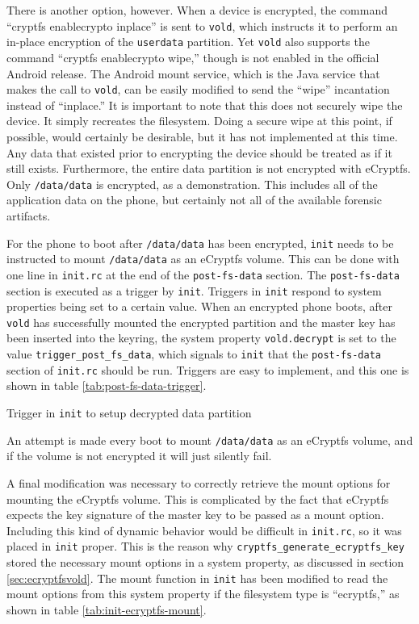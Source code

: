 There is another option, however. When a device is encrypted, the command ``cryptfs enablecrypto inplace'' is sent to \texttt{vold},
which instructs it to perform an in-place encryption of the \texttt{userdata} partition. Yet \texttt{vold} also supports the command
``cryptfs enablecrypto wipe,'' though is not enabled in the official Android release. The Android mount service, which is the Java
service that makes the call to \texttt{vold}, can be easily modified to send the ``wipe'' incantation instead of ``inplace.'' It is
important to note that this does not securely wipe the device. It simply recreates the filesystem. Doing a secure wipe at this
point, if possible, would certainly be desirable, but it has not implemented at this time. Any data that existed prior to encrypting
the device should be treated as if it still exists. Furthermore, the entire data partition is not encrypted with
eCryptfs. Only \texttt{/data/data} is encrypted, as a demonstration. This includes all of the application data on the phone, but
certainly not all of the available forensic artifacts.

For the phone to boot after \texttt{/data/data} has been encrypted, \texttt{init} needs to be instructed to mount \texttt{/data/data}
as an eCryptfs volume. This can be done with one line in \texttt{init.rc} at the end of the \texttt{post-fs-data} section. The
\texttt{post-fs-data} section is executed as a trigger by \texttt{init}. Triggers in \texttt{init} respond to system properties
being set to a certain value. When an encrypted phone boots, after \texttt{vold} has successfully mounted the encrypted partition and
the master key has been inserted into the keyring, the system property \texttt{vold.decrypt} is set to the value
\texttt{trigger\_post\_fs\_data}, which signals to \texttt{init} that the \texttt{post-fs-data} section of \texttt{init.rc} should
be run. Triggers are easy to implement, and this one is shown in table \ref{tab:post-fs-data-trigger}.  
\begin{table}
 
\caption{Trigger in \texttt{init} to setup decrypted data partition} 
\label{tab:post-fs-data-trigger}
\end{table} 
An attempt is made every boot to mount \texttt{/data/data} as an eCryptfs volume, and if the volume is not encrypted it will just
silently fail. 

A final modification was necessary to correctly retrieve the mount options for mounting the eCryptfs volume. This is complicated by
the fact that eCryptfs expects the key signature of the master key to be passed as a mount option.  Including this kind of dynamic
behavior would be difficult in \texttt{init.rc}, so it was placed in \texttt{init} proper. This is the reason why
\texttt{cryptfs\_generate\_ecryptfs\_key} stored the necessary mount options in a system property, as discussed in section
\ref{sec:ecryptfsvold}. The mount function in \texttt{init} has been modified to read the mount options from this system property if
the filesystem type is ``ecryptfs,'' as shown in table \ref{tab:init-ecryptfs-mount}.


